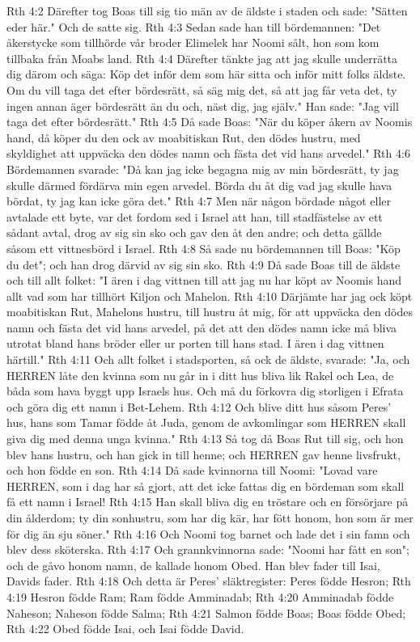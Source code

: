 Rth 4:2  Därefter tog Boas till sig tio män av de äldste i staden och sade: "Sätten eder här." Och de satte sig.
Rth 4:3  Sedan sade han till bördemannen: "Det åkerstycke som tillhörde vår broder Elimelek har Noomi sålt, hon som kom tillbaka från Moabs land.
Rth 4:4  Därefter tänkte jag att jag skulle underrätta dig därom och säga: Köp det inför dem som här sitta och inför mitt folks äldste. Om du vill taga det efter bördesrätt, så säg mig det, så att jag får veta det, ty ingen annan äger bördesrätt än du och, näst dig, jag själv." Han sade: "Jag vill taga det efter bördesrätt."
Rth 4:5  Då sade Boas: "När du köper åkern av Noomis hand, då köper du den ock av moabitiskan Rut, den dödes hustru, med skyldighet att uppväcka den dödes namn och fästa det vid hans arvedel."
Rth 4:6  Bördemannen svarade: "Då kan jag icke begagna mig av min bördesrätt, ty jag skulle därmed fördärva min egen arvedel. Börda du åt dig vad jag skulle hava bördat, ty jag kan icke göra det."
Rth 4:7  Men när någon bördade något eller avtalade ett byte, var det fordom sed i Israel att han, till stadfästelse av ett sådant avtal, drog av sig sin sko och gav den åt den andre; och detta gällde såsom ett vittnesbörd i Israel.
Rth 4:8  Så sade nu bördemannen till Boas: "Köp du det"; och han drog därvid av sig sin sko.
Rth 4:9  Då sade Boas till de äldste och till allt folket: "I ären i dag vittnen till att jag nu har köpt av Noomis hand allt vad som har tillhört Kiljon och Mahelon.
Rth 4:10  Därjämte har jag ock köpt moabitiskan Rut, Mahelons hustru, till hustru åt mig, för att uppväcka den dödes namn och fästa det vid hans arvedel, på det att den dödes namn icke må bliva utrotat bland hans bröder eller ur porten till hans stad. I ären i dag vittnen härtill."
Rth 4:11  Och allt folket i stadsporten, så ock de äldste, svarade: "Ja, och HERREN låte den kvinna som nu går in i ditt hus bliva lik Rakel och Lea, de båda som hava byggt upp Israels hus. Och må du förkovra dig storligen i Efrata och göra dig ett namn i Bet-Lehem.
Rth 4:12  Och blive ditt hus såsom Peres' hus, hans som Tamar födde åt Juda, genom de avkomlingar som HERREN skall giva dig med denna unga kvinna."
Rth 4:13  Så tog då Boas Rut till sig, och hon blev hans hustru, och han gick in till henne; och HERREN gav henne livsfrukt, och hon födde en son.
Rth 4:14  Då sade kvinnorna till Noomi: "Lovad vare HERREN, som i dag har så gjort, att det icke fattas dig en bördeman som skall få ett namn i Israel!
Rth 4:15  Han skall bliva dig en tröstare och en försörjare på din ålderdom; ty din sonhustru, som har dig kär, har fött honom, hon som är mer för dig än sju söner."
Rth 4:16  Och Noomi tog barnet och lade det i sin famn och blev dess sköterska.
Rth 4:17  Och grannkvinnorna sade: "Noomi har fått en son"; och de gåvo honom namn, de kallade honom Obed. Han blev fader till Isai, Davids fader.
Rth 4:18  Och detta är Peres' släktregister: Peres födde Hesron;
Rth 4:19  Hesron födde Ram; Ram födde Amminadab;
Rth 4:20  Amminadab födde Naheson; Naheson födde Salma;
Rth 4:21  Salmon födde Boas; Boas födde Obed;
Rth 4:22  Obed födde Isai, och Isai födde David.


